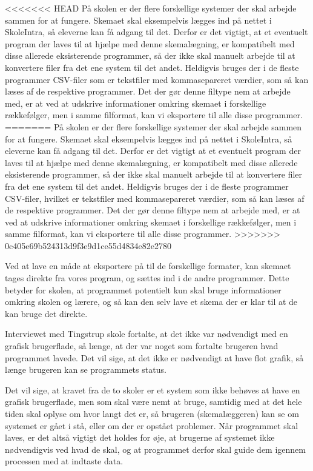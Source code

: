 <<<<<<< HEAD
På skolen er der flere forskellige systemer der skal arbejde sammen for at fungere. Skemaet skal eksempelvis lægges ind på nettet i SkoleIntra, så eleverne kan få adgang til det. Derfor er det vigtigt, at et eventuelt program der laves til at hjælpe med denne skemalægning, er kompatibelt med disse allerede eksisterende programmer, så der ikke skal manuelt arbejde til at konvertere filer fra det ene system til det andet. Heldigvis bruges der i de fleste programmer CSV-filer som er tekstfiler med kommasepareret værdier, som så kan læses af de respektive programmer. Det der gør denne filtype nem at arbejde med, er at ved at udskrive informationer omkring skemaet i forskellige rækkefølger, men i samme filformat, kan vi eksportere til alle disse programmer.
=======
På skolen er der flere forskellige systemer der skal arbejde sammen for at fungere. Skemaet skal eksempelvis lægges ind på nettet i SkoleIntra, så eleverne kan få adgang til det. Derfor er det vigtigt at et eventuelt program der laves til at hjælpe med denne skemalægning, er kompatibelt med disse allerede eksisterende programmer, så der ikke skal manuelt arbejde til at konvertere filer fra det ene system til det andet. Heldigvis bruges der i de fleste programmer CSV-filer, hvilket er tekstfiler med kommasepareret værdier, som så kan læses af de respektive programmer. Det der gør denne filtype nem at arbejde med, er at ved at udskrive informationer omkring skemaet i forskellige rækkefølger, men i samme filformat, kan vi eksportere til alle disse programmer.
>>>>>>> 0c405e69b524313d9f3e9d1ce55d4834e82e2780

Ved at lave en måde at eksportere på til de forskellige formater, kan skemaet tages direkte fra vores program, og sættes ind i de andre programmer. Dette betyder for skolen, at programmet potentielt kun skal bruge informationer omkring skolen og lærere, og så kan den selv lave et skema der er klar til at de kan bruge det direkte.

Interviewet med Tingstrup skole fortalte, at det ikke var nødvendigt med en grafisk brugerflade, så længe, at der var noget som fortalte brugeren hvad programmet lavede. Det vil sige, at det ikke er nødvendigt at have flot grafik, så længe brugeren kan se programmets status. 

Det vil sige, at kravet fra de to skoler er et system som ikke behøves at have en grafisk brugerflade, men som skal være nemt at bruge, samtidig med at det hele tiden skal oplyse om hvor langt det er, så brugeren (skemalæggeren) kan se om systemet er gået i stå, eller om der er opstået problemer. Når programmet skal laves, er det altså vigtigt det holdes for øje, at brugerne af systemet ikke nødvendigvis ved hvad de skal, og at programmet derfor skal guide dem igennem processen med at indtaste data.